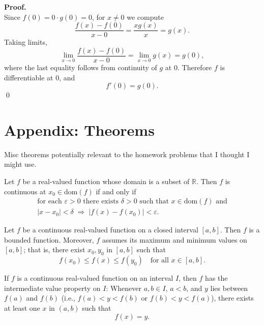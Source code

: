 \documentclass[12pt]{article}
\newenvironment{theorembox}[1][]%
{\begin{tcolorbox}[theoremstyle,title={#1}]}%
{\end{tcolorbox}}
\begin{document}
\textbf{Proof.}\\
Since $f(0)=0\cdot g(0)=0$, for $x\ne 0$ we compute
\[
\frac{f(x)-f(0)}{x-0}=\frac{xg(x)}{x}=g(x).
\]
Taking limits,
\[
\lim_{x\to 0}\frac{f(x)-f(0)}{x-0}
 = \lim_{x\to 0} g(x)
 = g(0),
\]
where the last equality follows from continuity of $g$ at $0$. Therefore $f$ is differentiable at $0$, and
\[
f'(0)=g(0).
\]
\qed


\newpage
\appendix
\section*{Appendix: Theorems}

Misc theorems potentially relevant to the homework problems that I thought I might use.
\begin{theorembox}[Theorem 17.2]
\label{thm:17.2}
Let $f$ be a real-valued function whose domain is a subset of $\mathbb{R}$.  
Then $f$ is continuous at $x_{0} \in \mathrm{dom}(f)$ if and only if  
\[
\begin{gathered}
\text{for each } \varepsilon > 0 \text{ there exists } \delta > 0 \text{ such that } 
x \in \mathrm{dom}(f) \text{ and}\\[0.4em]
|x - x_{0}| < \delta \;\Longrightarrow\; |f(x) - f(x_{0})| < \varepsilon.
\end{gathered}
\]
\end{theorembox}

\begin{theorembox}[Theorem 18.1 — Extreme Value Theorem]
\label{thm:18.1}
Let $f$ be a continuous real-valued function on a closed interval $[a,b]$.  
Then $f$ is a bounded function. Moreover, $f$ assumes its maximum and minimum
values on $[a,b]$; that is, there exist $x_{0}, y_{0}$ in $[a,b]$ such that  
\[
  f(x_{0}) \le f(x) \le f(y_{0}) \quad \text{for all } x \in [a,b].
\]
\end{theorembox}

\begin{theorembox}[Theorem 18.2 — Intermediate Value Theorem]
\label{thm:18.2}
If $f$ is a continuous real-valued function on an interval $I$, then $f$ has  
the intermediate value property on $I$: Whenever $a,b \in I$, $a < b$, and $y$  
lies between $f(a)$ and $f(b)$ (i.e., $f(a) < y < f(b)$ or $f(b) < y < f(a)$),  
there exists at least one $x$ in $(a,b)$ such that  
\[
  f(x) = y.
\]
\end{theorembox}
\end{document}
